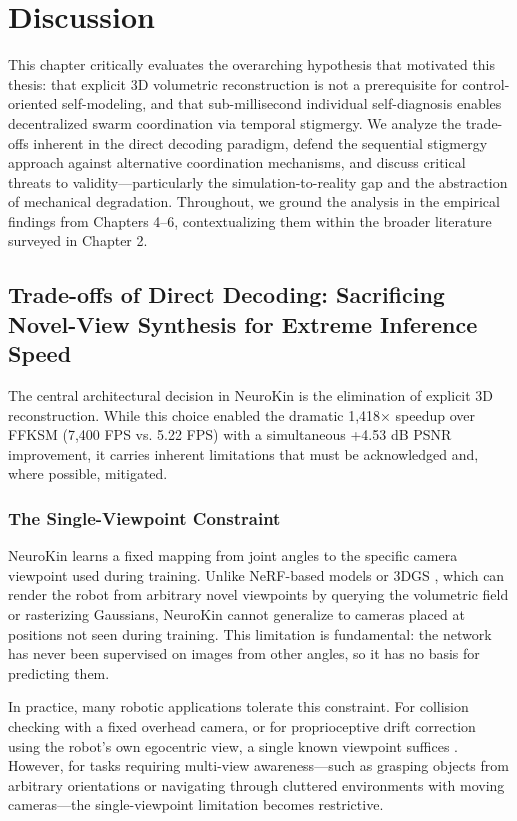\documentclass[12pt,a4paper,oneside]{report}
\begin{document}
\chapter{Discussion}

This chapter critically evaluates the overarching hypothesis that motivated this thesis: that explicit 3D volumetric reconstruction is not a prerequisite for control-oriented self-modeling, and that sub-millisecond individual self-diagnosis enables decentralized swarm coordination via temporal stigmergy. We analyze the trade-offs inherent in the direct decoding paradigm, defend the sequential stigmergy approach against alternative coordination mechanisms, and discuss critical threats to validity—particularly the simulation-to-reality gap and the abstraction of mechanical degradation. Throughout, we ground the analysis in the empirical findings from Chapters 4–6, contextualizing them within the broader literature surveyed in Chapter 2.

\section{Trade-offs of Direct Decoding: Sacrificing Novel-View Synthesis for Extreme Inference Speed}

The central architectural decision in NeuroKin is the elimination of explicit 3D reconstruction. While this choice enabled the dramatic 1,418× speedup over FFKSM (7,400 FPS vs. 5.22 FPS) with a simultaneous +4.53 dB PSNR improvement, it carries inherent limitations that must be acknowledged and, where possible, mitigated.

\subsection{The Single-Viewpoint Constraint}

NeuroKin learns a fixed mapping from joint angles to the specific camera viewpoint used during training. Unlike NeRF-based models \cite{mildenhall2020nerf} or 3DGS \cite{kerbl20233d}, which can render the robot from arbitrary novel viewpoints by querying the volumetric field or rasterizing Gaussians, NeuroKin cannot generalize to cameras placed at positions not seen during training. This limitation is fundamental: the network has never been supervised on images from other angles, so it has no basis for predicting them.

In practice, many robotic applications tolerate this constraint. For collision checking with a fixed overhead camera, or for proprioceptive drift correction using the robot's own egocentric view, a single known viewpoint suffices \cite{hu2024teaching, chen2022full}. However, for tasks requiring multi-view awareness—such as grasping objects from arbitrary orientations or navigating through cluttered environments with moving cameras—the single-viewpoint limitation becomes restrictive.
\end{document}
